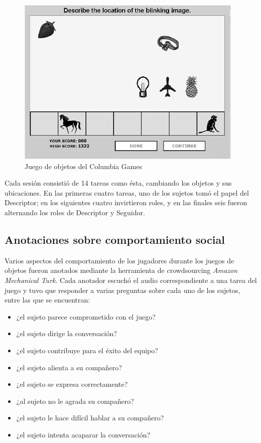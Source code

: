 \begin{figure}
\centering
\includegraphics[scale=0.5]{images/columbia_games.jpg}
\caption{Juego de objetos del Columbia Games}
\label{objects_game}
\end{figure}


Cada sesión consistió de 14 tareas como ésta, cambiando los objetos y sus ubicaciones. En las primeras cuatro tareas, uno de los sujetos tomó el papel del Descriptor; en los siguientes cuatro invirtieron roles, y en las finales seis fueron alternando los roles de Descriptor y Seguidor.

\subsection{Anotaciones sobre comportamiento social}

Varios aspectos del comportamiento de los jugadores durante los juegos de objetos fueron anotados mediante la herramienta de crowdsourcing \emph{Amazon Mechanical Turk}. Cada anotador escuchó el audio correspondiente a una tarea del juego y tuvo que responder a varias preguntas sobre cada uno de los sujetos, entre las que se encuentran:

\begin{itemize}
  \item ¿el sujeto parece comprometido con el juego?
  \item ¿el sujeto dirige la conversación?
  \item ¿el sujeto contribuye para el éxito del equipo?
  \item ¿el sujeto alienta a su compañero?
  \item ¿el sujeto se expresa correctamente?
  \item ¿al sujeto no le agrada su compañero?
  \item ¿el sujeto le hace difícil hablar a su compañero?
  \item ¿el sujeto intenta acaparar la conversación?
\end{itemize}

